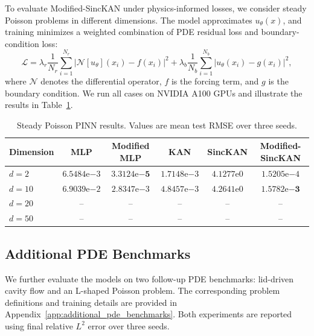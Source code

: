 \documentclass[preprint,12pt]{elsarticle}
\begin{document}
To evaluate Modified-SincKAN under physics-informed losses, we consider steady Poisson problems in different dimensions. The model approximates \(u_\theta(x)\), and training minimizes a weighted combination of PDE residual loss and boundary-condition loss:
\begin{equation}
  \mathcal{L}
  =
  \lambda_r
  \frac{1}{N_r}
  \sum_{i=1}^{N_r}
  \left|
  \mathcal{N}[u_\theta](x_i)-f(x_i)
  \right|^2
  +
  \lambda_b
  \frac{1}{N_b}
  \sum_{i=1}^{N_b}
  \left|
  u_\theta(x_i)-g(x_i)
  \right|^2,
\end{equation}
where \(\mathcal{N}\) denotes the differential operator, \(f\) is the forcing term, and \(g\) is the boundary condition. We run all cases on NVIDIA A100 GPUs and illustrate the results in Table~\ref{tab:pinn_poisson}.

\begin{table}[t]
\centering
\caption{Steady Poisson PINN results. Values are mean test RMSE over three seeds.}
\label{tab:pinn_poisson}
\begin{tabular}{lccccc}
\toprule
Dimension & MLP & Modified MLP & KAN & SincKAN & Modified-SincKAN \\
\midrule
\(d=2\) & \(6.5484\mathrm{e}{-3}\) & \(\mathbf{3.3124\mathrm{e}{-5}}\) & \(1.7148\mathrm{e}{-3}\) & \(4.1277\mathrm{e}{0}\) & \(1.5205\mathrm{e}{-4}\) \\
\(d=10\) & \(6.9039\mathrm{e}{-2}\) & \(2.8347\mathrm{e}{-3}\) & \(4.8457\mathrm{e}{-3}\) & \(4.2641\mathrm{e}{0}\) & \(\mathbf{1.5782\mathrm{e}{-3}}\) \\
\(d=20\) & -- & -- & -- & -- & -- \\
\(d=50\) & -- & -- & -- & -- & -- \\
\bottomrule
\end{tabular}
\end{table}

\subsection{Additional PDE Benchmarks}

We further evaluate the models on two follow-up PDE benchmarks: lid-driven cavity flow and an L-shaped Poisson problem. The corresponding problem definitions and training details are provided in Appendix~\ref{app:additional_pde_benchmarks}. Both experiments are reported using final relative \(L^2\) error over three seeds.
\end{document}
